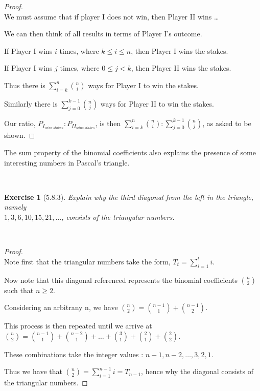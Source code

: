 \documentclass[12pt]{article}
\newcommand{\XB}{\color{black}}
\newcommand{\XBB}{\color{blue}}
\newcommand{\ds}{\displaystyle}
\theoremstyle{plain}
\newtheorem{ex}{Exercise}
\begin{document}
\begin{proof}
  \ \\

  We must assume that if player I does not win, then Player II wins \dots

  We can then think of all results in terms of Player I's outcome.

  If Player I wins $ i $ times, where $ k \le i \le n $, then Player I wins the stakes.

  If Player I wins $ j $ times, where $ 0 \le j < k $, then Player II wins the stakes.

  Thus there is $ \ds \sum_{i = k}^{n} \binom{n}{i} $ ways for Player I to win the stakes.

  Similarly there is $ \ds \sum_{j = 0}^{k-1} \binom{n}{j} $ ways for Player II to win the stakes.

  Our ratio, $ P_{I_{wins \ stakes}} : P_{II_{wins \ stakes}} $, is then $ \ds \sum_{i = k}^{n} \binom{n}{i} : \sum_{j = 0}^{k-1} \binom{n}{j} $, as asked to be shown. 
\end{proof}

\newpage

The sum property of the binomial coefficients also explains the presence of some interesting numbers in Pascal's triangle.


\XBB\hrulefill\XB \\
\begin{ex} [5.8.3]
  Explain why the third diagonal from the left in the triangle, namely \\
  $ 1, 3, 6, 10, 15, 21, \ldots $, consists of the triangular numbers.
\end{ex}
\XBB\hrulefill\XB \\

\begin{proof}
  \ \\

  Note first that the triangular numbers take the form, $ \ds T_{t} = \sum_{i = 1}^{t} i $.

  Now note that this diagonal referenced represents the binomial coefficients $ \ds \binom{n}{2} $ such that $ n \ge 2 $. 

  Considering an arbitrany n, we have $ \ds \binom{n}{2} = \binom{n - 1}{1} + \binom{n - 1}{2} $. 
  
  This process is then repeated until we arrive at $ \ds \binom{n}{2} = \binom{n - 1}{1} + \binom{n - 2}{1} + \dots + \binom{3}{1} + \binom{2}{1} + \binom{2}{2} $.

  These combinations take the integer values : $ n - 1, n - 2, \dots, 3, 2, 1 $.

  Thus we have that $ \ds \binom{n}{2} = \sum_{i = 1}^{n - 1} i = T_{n - 1} $, hence why the diagonal consists of the triangular numbers.
\end{proof}
\end{document}
